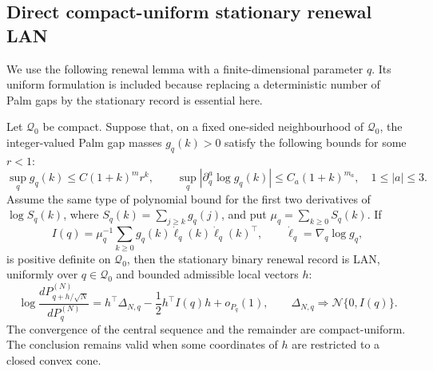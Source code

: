 \subsection{Direct compact-uniform stationary renewal LAN}
\label{sec:direct-stationary-renewal-lan-supp}

We use the following renewal lemma with a finite-dimensional parameter
\(q\).  Its uniform formulation is included because replacing a deterministic
number of Palm gaps by the stationary record is essential here.

\begin{lemma}
\label{lem:compact-uniform-stationary-renewal-lan-main}
Let \(\mathcal Q_0\) be compact.  Suppose that, on a fixed one-sided
neighbourhood of \(\mathcal Q_0\), the integer-valued Palm gap masses
\(g_q(k)>0\) satisfy the following bounds for some \(r<1\):
\[
 \sup_q g_q(k)\le C(1+k)^m r^k,
 \qquad
 \sup_q|\partial_q^a\log g_q(k)|\le C_a(1+k)^{m_a},
 \quad 1\le |a|\le3.
\tag{SL1}\label{eq:sl1-supp}
\]
Assume the same type of polynomial bound for the first two derivatives of
\(\log S_q(k)\), where \(S_q(k)=\sum_{j\ge k}g_q(j)\), and put
\(\mu_q=\sum_{k\ge0}S_q(k)\).  If
\[
 I(q)=\mu_q^{-1}\sum_{k\ge0}g_q(k)
 \dot\ell_q(k)\dot\ell_q(k)^\top,
 \qquad \dot\ell_q=\nabla_q\log g_q,
\tag{SL2}\label{eq:sl2-supp}
\]
is positive definite on \(\mathcal Q_0\), then the stationary binary renewal
record is LAN, uniformly over \(q\in\mathcal Q_0\) and bounded admissible
local vectors \(h\):
\[
 \log\frac{dP_{q+h/\sqrt N}^{(N)}}{dP_q^{(N)}}
 =h^\top\Delta_{N,q}-\frac12h^\top I(q)h+o_{P_q}(1),
 \qquad
 \Delta_{N,q}\Rightarrow\mathcal N\{0,I(q)\}.
\tag{SL3}\label{eq:sl3-supp}
\]
The convergence of the central sequence and the remainder are compact-uniform.
The conclusion remains valid when some coordinates of \(h\) are restricted
to a closed convex cone.
\end{lemma}

